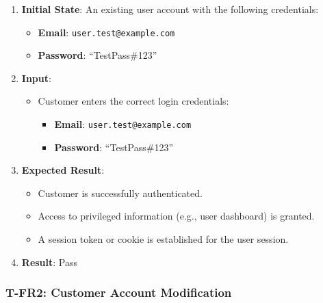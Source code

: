 \documentclass[12pt, titlepage]{article}
\begin{document}
\begin{enumerate}
    \item \textbf{Initial State}: An existing user account with the following credentials:
    \begin{itemize}
        \item \textbf{Email}: \texttt{user.test@example.com}
        \item \textbf{Password}: ``TestPass\#123''
    \end{itemize}
    \item \textbf{Input}:
    \begin{itemize}
        \item Customer enters the correct login credentials:
        \begin{itemize}
            \item \textbf{Email}: \texttt{user.test@example.com}
            \item \textbf{Password}: ``TestPass\#123''
        \end{itemize}
    \end{itemize}

        \item \textbf{Expected Result}:
        \begin{itemize}
            \item Customer is successfully authenticated.
            \item Access to privileged information (e.g., user dashboard) is granted.
            \item A session token or cookie is established for the user session.
        \end{itemize}
        \item \textbf{Result}: Pass
\end{enumerate}

\subsubsection*{T-FR2: Customer Account Modification}
\end{document}

